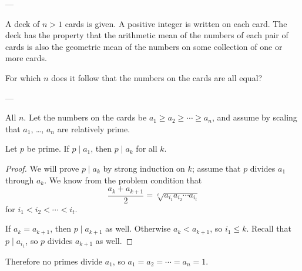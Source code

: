 
---

A deck of $n>1$ cards is given. A positive integer is written on each card. The deck has the property that the arithmetic mean of the numbers of each pair of cards is also the geometric mean of the numbers on some collection of one or more cards.

For which $n$ does it follow that the numbers on the cards are all equal?

---

All $n$. Let the numbers on the cards be $a_1\ge a_2\ge\cdots\ge a_n$, and assume by scaling that $a_1$, \ldots, $a_n$ are relatively prime.
\begin{claim*}
    Let $p$ be prime. If $p\mid a_1$, then $p\mid a_k$ for all $k$.
\end{claim*}
\begin{proof}
    We will prove $p\mid a_k$ by strong induction on $k$; assume that $p$ divides $a_1$ through $a_k$. We know from the problem condition that
    \[\frac{a_k+a_{k+1}}2=\sqrt[t]{a_{i_1}a_{i_2}\cdots a_{i_t}}\]
    for $i_1<i_2<\cdots<i_t$.

    If $a_k=a_{k+1}$, then $p\mid a_{k+1}$ as well. Otherwise $a_k<a_{k+1}$, so $i_1\le k$. Recall that $p\mid a_{i_1}$, so $p$ divides $a_{k+1}$ as well.
\end{proof}
Therefore no primes divide $a_1$, so $a_1=a_2=\cdots=a_n=1$.

